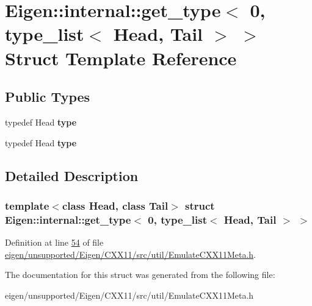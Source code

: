 \hypertarget{struct_eigen_1_1internal_1_1get__type_3_010_00_01type__list_3_01_head_00_01_tail_01_4_01_4}{}\section{Eigen\+:\+:internal\+:\+:get\+\_\+type$<$ 0, type\+\_\+list$<$ Head, Tail $>$ $>$ Struct Template Reference}
\label{struct_eigen_1_1internal_1_1get__type_3_010_00_01type__list_3_01_head_00_01_tail_01_4_01_4}
\subsection*{Public Types}
\begin{DoxyCompactItemize}
\item 
\mbox{\label{struct_eigen_1_1internal_1_1get__type_3_010_00_01type__list_3_01_head_00_01_tail_01_4_01_4_ac59748477d03311b004d3cc8fde61a36}} 
typedef Head {\bfseries type}
\item 
\mbox{\label{struct_eigen_1_1internal_1_1get__type_3_010_00_01type__list_3_01_head_00_01_tail_01_4_01_4_ac59748477d03311b004d3cc8fde61a36}} 
typedef Head {\bfseries type}
\end{DoxyCompactItemize}


\subsection{Detailed Description}
\subsubsection*{template$<$class Head, class Tail$>$\newline
struct Eigen\+::internal\+::get\+\_\+type$<$ 0, type\+\_\+list$<$ Head, Tail $>$ $>$}



Definition at line \hyperlink{eigen_2unsupported_2_eigen_2_c_x_x11_2src_2util_2_emulate_c_x_x11_meta_8h_source_l00054}{54} of file \hyperlink{eigen_2unsupported_2_eigen_2_c_x_x11_2src_2util_2_emulate_c_x_x11_meta_8h_source}{eigen/unsupported/\+Eigen/\+C\+X\+X11/src/util/\+Emulate\+C\+X\+X11\+Meta.\+h}.



The documentation for this struct was generated from the following file\+:\begin{DoxyCompactItemize}
\item 
eigen/unsupported/\+Eigen/\+C\+X\+X11/src/util/\+Emulate\+C\+X\+X11\+Meta.\+h\end{DoxyCompactItemize}
